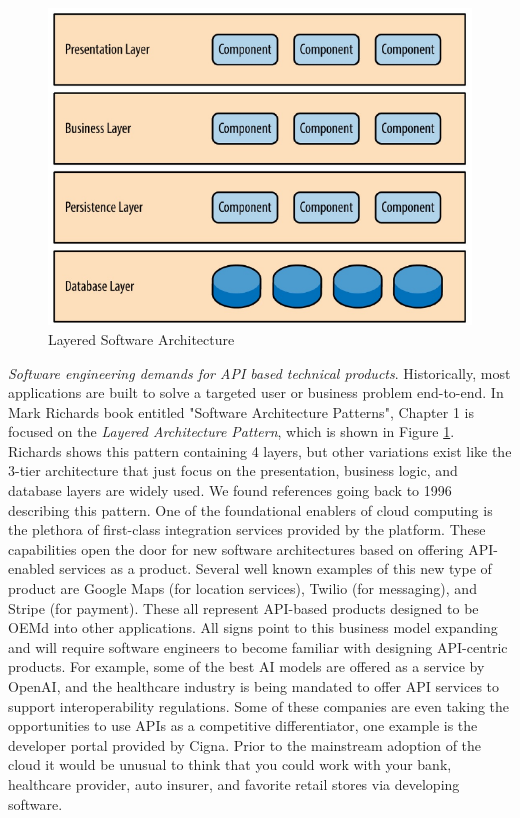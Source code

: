 \documentclass[conference]{IEEEtran}
\begin{document}
\begin{figure}
	\includegraphics[width=\columnwidth]{images/LayeredArchitecture}	
	\caption{Layered Software Architecture}
	\label{fig:LayeredArchitecture}
\end{figure}

\textit{Software engineering demands for API based technical products}.  Historically, most applications are built to solve a targeted user or business problem end-to-end.  In Mark Richards book entitled "Software Architecture Patterns"\cite{richards2015software}, Chapter 1 is focused on the \textit{Layered Architecture Pattern}, which is shown in Figure \ref{fig:LayeredArchitecture}. Richards shows this pattern containing 4 layers, but other variations exist like the 3-tier architecture that just focus on the presentation, business logic, and database layers are widely used. We found references going back to 1996\cite{aarsten1996patterns} describing this pattern. One of the foundational enablers of cloud computing is the plethora of first-class integration services provided by the platform. These capabilities open the door for new software architectures based on offering API-enabled services as a product. Several well known examples of this new type of product are Google Maps (for location services), Twilio (for messaging), and Stripe (for payment). These all represent API-based products designed to be OEMd into other applications. All signs point to this business model expanding and will require software engineers to become familiar with designing API-centric products.  For example, some of the best AI models are offered as a service by OpenAI\cite{OpenAI}, and the healthcare industry is being mandated to offer API services to support interoperability\cite{FHIRAPI} regulations.  Some of these companies are even taking the opportunities to use APIs as a competitive differentiator, one example is the developer portal provided by Cigna\cite{CignaDeveloper}. Prior to the mainstream adoption of the cloud it would be unusual to think that you could work with your bank, healthcare provider, auto insurer, and favorite retail stores via developing software. 
\end{document}
